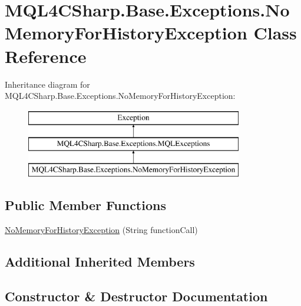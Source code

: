 \hypertarget{class_m_q_l4_c_sharp_1_1_base_1_1_exceptions_1_1_no_memory_for_history_exception}{}\section{M\+Q\+L4\+C\+Sharp.\+Base.\+Exceptions.\+No\+Memory\+For\+History\+Exception Class Reference}
\label{class_m_q_l4_c_sharp_1_1_base_1_1_exceptions_1_1_no_memory_for_history_exception}
Inheritance diagram for M\+Q\+L4\+C\+Sharp.\+Base.\+Exceptions.\+No\+Memory\+For\+History\+Exception\+:\begin{figure}[H]
\begin{center}
\leavevmode
\includegraphics[height=3.000000cm]{class_m_q_l4_c_sharp_1_1_base_1_1_exceptions_1_1_no_memory_for_history_exception}
\end{center}
\end{figure}
\subsection*{Public Member Functions}
\begin{DoxyCompactItemize}
\item 
\hyperlink{class_m_q_l4_c_sharp_1_1_base_1_1_exceptions_1_1_no_memory_for_history_exception_aad4a1fbe9132b9241c6f01b34a7738b3}{No\+Memory\+For\+History\+Exception} (String function\+Call)
\end{DoxyCompactItemize}
\subsection*{Additional Inherited Members}


\subsection{Constructor \& Destructor Documentation}
